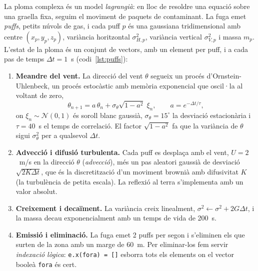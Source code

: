 \documentclass[11pt,a4paper]{article}
\begin{document}
La ploma complexa és un model \emph{lagrangià}: en lloc de resoldre una equació sobre una graella fixa, seguim el moviment de paquets de contaminant. La fuga emet \emph{puffs}, petits núvols de gas, i cada puff $p$ és una gaussiana tridimensional amb centre $(x_p, y_p, z_p)$, variància horitzontal $\sigma_{H,p}^2$, variància vertical $\sigma_{V,p}^2$ i massa $m_p$. L'estat de la ploma és un conjunt de vectors, amb un element per puff, i a cada pas de temps $\Delta t = 1$~s (codi~\ref{lst:puffs}):
\begin{enumerate}
\item \textbf{Meandre del vent.} La direcció del vent $\theta$ segueix un procés d'Ornstein-Uhlenbeck, un procés estocàstic amb memòria exponencial que oscil·la al voltant de zero,
\begin{equation}
\theta_{n+1} = a\,\theta_n + \sigma_\theta \sqrt{1-a^2}\;\xi_n, \qquad a = e^{-\Delta t/\tau},
\end{equation}
on $\xi_n \sim \mathcal{N}(0,1)$ és soroll blanc gaussià, $\sigma_\theta = 15^\circ$ la desviació estacionària i $\tau = 40$~s el temps de correlació. El factor $\sqrt{1-a^2}$ fa que la variància de $\theta$ sigui $\sigma_\theta^2$ per a qualsevol $\Delta t$.
\item \textbf{Advecció i difusió turbulenta.} Cada puff es desplaça amb el vent, $U = 2$~m/s en la direcció $\theta$ (\emph{advecció}), més un pas aleatori gaussià de desviació $\sqrt{2K\Delta t}$, que és la discretització d'un moviment brownià amb difusivitat $K$ (la turbulència de petita escala). La reflexió al terra s'implementa amb un valor absolut.
\item \textbf{Creixement i decaïment.} La variància creix linealment, $\sigma^2 \leftarrow \sigma^2 + 2G\Delta t$, i la massa decau exponencialment amb un temps de vida de 200~s.
\item \textbf{Emissió i eliminació.} La fuga emet 2 puffs per segon i s'eliminen els que surten de la zona amb un marge de 60~m. Per eliminar-los fem servir \emph{indexació lògica}: \texttt{e.x(fora) = []} esborra tots els elements on el vector booleà \texttt{fora} és cert.
\end{enumerate}
\end{document}
